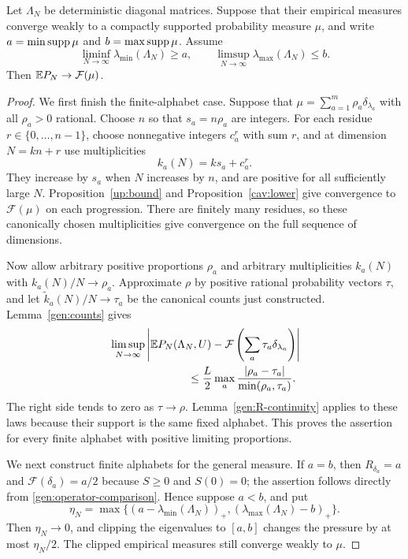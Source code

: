 \begin{proposition}\label{gen:approximation}
Let $\Lambda_N$ be deterministic diagonal matrices.  Suppose that their
empirical measures converge weakly to a compactly supported probability
measure $\mu$, and write
$a=\min\operatorname{supp}\mu$ and $b=\max\operatorname{supp}\mu$.  Assume
\[
 \liminf_{N\to\infty}\lambda_{\min}(\Lambda_N)\ge a,
 \qquad
 \limsup_{N\to\infty}\lambda_{\max}(\Lambda_N)\le b.
\]
Then $\mathbb E P_N\to\mathcal F(\mu)$.
\end{proposition}

\begin{proof}
We first finish the finite-alphabet case.  Suppose that
$\mu=\sum_{a=1}^m\rho_a\delta_{\lambda_a}$ with all $\rho_a>0$
rational.  Choose $n$ so that $s_a=n\rho_a$ are integers.  For each
residue $r\in\{0,\ldots,n-1\}$, choose nonnegative integers $c_a^r$
with sum $r$, and at dimension $N=kn+r$ use multiplicities
\[
 k_a(N)=ks_a+c_a^r.
\]
They increase by $s_a$ when $N$ increases by $n$, and are positive
for all sufficiently large $N$.  Proposition~\ref{up:bound} and
Proposition~\ref{cav:lower} give convergence to $\mathcal F(\mu)$ on
each progression.  There are finitely many residues, so these
canonically chosen multiplicities give convergence on the full
sequence of dimensions.

Now allow arbitrary positive proportions $\rho_a$ and arbitrary
multiplicities $k_a(N)$ with $k_a(N)/N\to\rho_a$.  Approximate
$\rho$ by positive rational probability vectors $\tau$, and let
$\widetilde k_a(N)/N\to\tau_a$ be the canonical counts just
constructed.  Lemma~\ref{gen:counts} gives
\begin{align*}
 &\limsup_{N\to\infty}
 \left|\E P_N(\Lambda_N,U)-
             \mathcal F\left(\sum_a\tau_a\delta_{\lambda_a}\right)
       \right|\\
 &\hspace{25mm}\le
 \frac L2\max_a\frac{|\rho_a-\tau_a|}{\min(\rho_a,\tau_a)}.
\end{align*}
The right side tends to zero as $\tau\to\rho$.
Lemma~\ref{gen:R-continuity} applies to these laws because their
support is the same fixed alphabet.  This proves the assertion for
every finite alphabet with positive limiting proportions.

We next construct finite alphabets for the general measure.  If $a=b$,
then $R_{\delta_a}=a$ and $\mathcal F(\delta_a)=a/2$ because
$S\ge0$ and $S(0)=0$; the assertion follows directly from
\eqref{gen:operator-comparison}.  Hence suppose $a<b$, and put
\[
 \eta_N=\max\{(a-\lambda_{\min}(\Lambda_N))_+,
                   (\lambda_{\max}(\Lambda_N)-b)_+\}.
\]
Then $\eta_N\to0$, and clipping the eigenvalues to $[a,b]$ changes
the pressure by at most $\eta_N/2$.  The clipped empirical measures
still converge weakly to $\mu$.


\end{proof}
